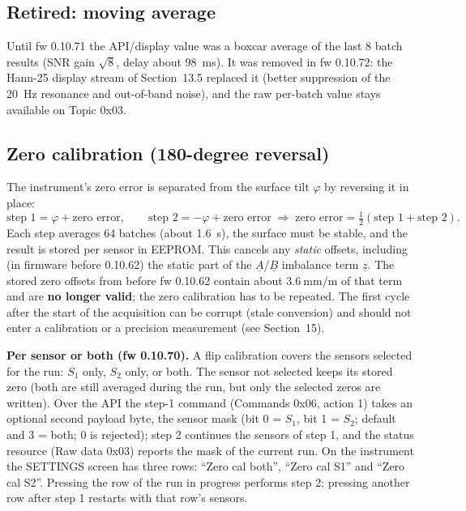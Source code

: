 \documentclass[11pt,a4paper]{article}
\begin{document}
\subsection{Retired: moving average}

Until fw 0.10.71 the API/display value was a boxcar average of the last 8 batch
results (SNR gain $\sqrt{8}$, delay about \SI{98}{\milli\second}).  It was
removed in fw 0.10.72: the Hann-25 display stream of Section~13.5 replaced it
(better suppression of the \SI{20}{\hertz} resonance and out-of-band noise),
and the raw per-batch value stays available on Topic 0x03.

\subsection{Zero calibration (180-degree reversal)}

The instrument's zero error is separated from the surface tilt $\varphi$
by reversing it in place:
\begin{equation}
  \text{step 1} = \varphi + \text{zero error},\qquad
  \text{step 2} = -\varphi + \text{zero error}
  \;\Rightarrow\;
  \text{zero error} = \tfrac12(\text{step 1}+\text{step 2}).
\end{equation}
Each step averages 64 batches (about \SI{1.6}{\second}), the surface must be
stable, and the result is stored per sensor in EEPROM.  This cancels any
\emph{static} offsets, including (in firmware before 0.10.62) the static part of
the $\underline{A}$/$\underline{B}$ imbalance term $\underline{z}$.  The
stored zero offsets from before fw 0.10.62 contain about
$\SI{3.6}{\milli\metre\per\metre}$ of that term and are \textbf{no longer valid};
the zero calibration has to be repeated.  The first cycle after the start of
the acquisition can be corrupt (stale conversion) and should not enter a
calibration or a precision measurement (see Section~15).

\textbf{Per sensor or both (fw 0.10.70).}  A flip calibration covers the sensors
selected for the run: $S_1$ only, $S_2$ only, or both.  The sensor not selected
keeps its stored zero (both are still averaged during the run, but only the
selected zeros are written).  Over the API the step-1 command
(Commands 0x06, action 1) takes an optional second payload byte, the sensor mask
(bit 0 = $S_1$, bit 1 = $S_2$; default and 3 = both; 0 is rejected); step 2
continues the sensors of step 1, and the status resource (Raw data 0x03) reports
the mask of the current run.  On the instrument the SETTINGS screen has three
rows: ``Zero cal both'', ``Zero cal S1'' and ``Zero cal S2''.  Pressing the row of
the run in progress performs step 2; pressing another row after step 1 restarts
with that row's sensors.
\end{document}
